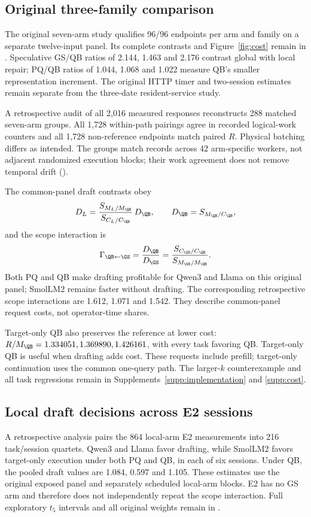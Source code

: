 \subsection{Original three-family comparison}
\label{sec:economics}
The original seven-arm study qualifies 96/96 endpoints per arm and family on a separate twelve-input panel. Its complete contrasts and Figure~\ref{fig:cost} remain in . Speculative GS/QB ratios of 2.144, 1.463 and 2.176 contrast global with local repair; PQ/QB ratios of 1.044, 1.068 and 1.022 measure QB's smaller representation increment. The original HTTP timer and two-session estimates remain separate from the three-date resident-service study.

A retrospective audit of all 2,016 measured responses reconstructs 288 matched seven-arm groups. All 1,728 within-path pairings agree in recorded logical-work counters and all 1,728 non-reference endpoints match paired $R$. Physical batching differs as intended. The groups match records across 42 arm-specific workers, not adjacent randomized execution blocks; their work agreement does not remove temporal drift ().

The common-panel draft contrasts obey
\begin{equation}
D_L=\frac{S_{M_L/M_{\QB}}}{S_{C_L/C_{\QB}}}\,D_{\QB},\qquad D_{\QB}=S_{M_{\QB}/C_{\QB}},
\label{eq:draft}
\end{equation}
and the scope interaction is
\begin{equation}
\Gamma_{\QB\leftarrow\GS}=\frac{D_{\QB}}{D_{\GS}}
=\frac{S_{C_{\GS}/C_{\QB}}}{S_{M_{\GS}/M_{\QB}}}.
\label{eq:repairinteraction}
\end{equation}
Both PQ and QB make drafting profitable for Qwen3 and Llama on this original panel; SmolLM2 remains faster without drafting. The corresponding retrospective scope interactions are 1.612, 1.071 and 1.542. They describe common-panel request costs, not operator-time shares.

Target-only QB also preserves the reference at lower cost: $R/M_{\QB}=1.334051,1.369890,1.426161$, with every task favoring QB. Target-only QB is useful when drafting adds cost. These requests include prefill; target-only continuation uses the common one-query path. The larger-$k$ counterexample and all task regressions remain in Supplements~\ref{supp:implementation} and \ref{supp:cost}.

\subsection{Local draft decisions across E2 sessions}
\label{sec:e2draft}
A retrospective analysis pairs the 864 local-arm E2 measurements into 216 task/session quartets. Qwen3 and Llama favor drafting, while SmolLM2 favors target-only execution under both PQ and QB, in each of six sessions. Under QB, the pooled draft values are 1.084, 0.597 and 1.105. These estimates use the original exposed panel and separately scheduled local-arm blocks. E2 has no GS arm and therefore does not independently repeat the scope interaction. Full exploratory $t_5$ intervals and all original weights remain in .

